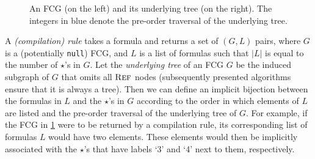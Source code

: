 \begin{figure}
\centering
\begin{subfigure}{0.49\textwidth}
\centering
{}
\end{subfigure}
\begin{subfigure}{0.49\textwidth}
\centering
{}
\end{subfigure}
\caption{An FCG (on the left) and its underlying tree (on the right). The integers in blue denote the pre-order traversal of the underlying tree.}
\label{fig:ordering}
\end{figure}

A \emph{(compilation) rule} takes a formula and returns a set of $(G, L)$ pairs, where $G$ is a (potentially \texttt{null}) FCG, and $L$ is a list of formulas such that $|L|$ is equal to the number of $\star$'s in $G$. Let the \emph{underlying tree} of an FCG $G$ be the induced subgraph of $G$ that omits all $\operatorname{\textsc{Ref}}$ nodes (subsequently presented algorithms ensure that it is always a tree). Then we can define an implicit bijection between the formulas in $L$ and the $\star$'s in $G$ according to the order in which elements of $L$ are listed and the pre-order traversal of the underlying tree of $G$. For example, if the FCG in \cref{fig:ordering} were to be returned by a compilation rule, its corresponding list of formulas $L$ would have two elements. These elements would then be implicitly associated with the $\star$'s that have labels `3' and `4' next to them, respectively.



